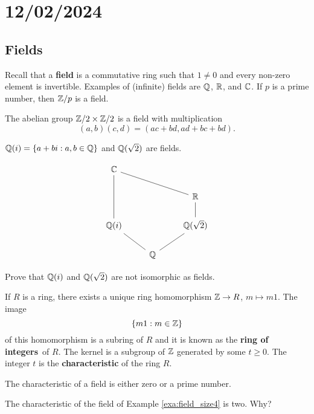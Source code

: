 \section{12/02/2024}

\subsection{Fields}

Recall that a \textbf{field} is a commutative
ring such that $1\ne 0$ and 
every non-zero element is invertible. Examples
of (infinite) fields are $\mathbb{Q}$, $\mathbb{R}$, and $\mathbb{C}$. If $p$
is a prime number, then $\mathbb{Z}/p$ is a field. 

\begin{example}
\label{exa:field_size4}
	The abelian group $\mathbb{Z}/2\times\mathbb{Z}/2$ is a field
	with multiplication
	\[
		(a,b)(c,d)=(ac+bd,ad+bc+bd).
	\]
\end{example}

\begin{example}
	$\mathbb{Q}(i)=\{a+bi:a,b\in\mathbb{Q}\}$ and 
	$\mathbb{Q}(\sqrt{2})$ are fields.
\end{example}

\[
\begin{tikzcd}
	{\mathbb{C}} \\
	&& {\mathbb{R}} \\
	{\mathbb{Q}(i)} && {\mathbb{Q}(\sqrt{2})} \\
	& {\mathbb{Q}}
	\arrow[no head, from=3-3, to=4-2]
	\arrow[no head, from=2-3, to=3-3]
	\arrow[no head, from=1-1, to=3-1]
	\arrow[no head, from=3-1, to=4-2]
	\arrow[no head, from=1-1, to=2-3]
\end{tikzcd}
\]


\begin{exercise}
	\label{xca:Q(i)}
	Prove that $\mathbb{Q}(i)$ and $\mathbb{Q}(\sqrt{2})$ are not isomorphic as fields.
\end{exercise}

If $R$ is a ring, there exists a unique ring homomorphism
$\mathbb{Z}\to R$, $m\mapsto m1$. The image 
\[
\{m1:m\in\mathbb{Z}\}
\]
of this homomorphism is a subring 
of $R$ and it is known as the \textbf{ring of integers} of $R$. The
kernel is a subgroup of $\mathbb{Z}$ generated by
some $t\geq0$. The integer $t$ is 
the \textbf{characteristic} of the ring $R$. 

\begin{exercise}
The characteristic of a field is either zero or
a prime number. 
\end{exercise}

\begin{example}
    The characteristic of the field of Example \ref{exa:field_size4}
    is two. Why?
\end{example}

